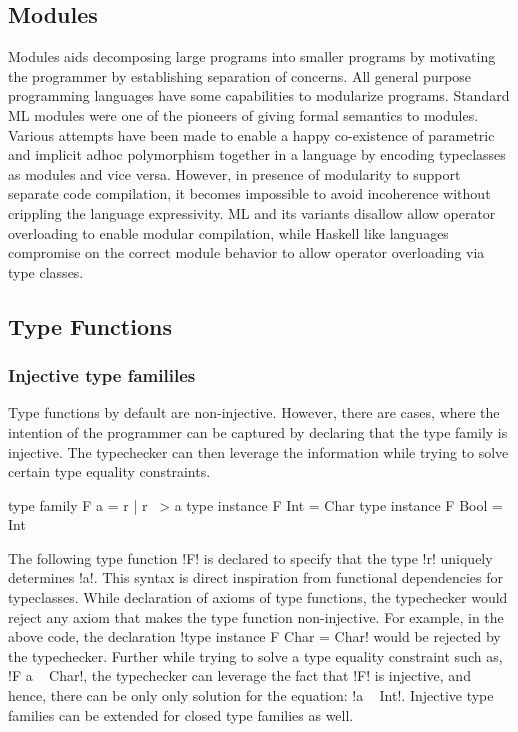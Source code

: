\documentclass[manuscript,screen,nonacm]{acmart}
\begin{document}
\subsection{Modules}
Modules aids decomposing large programs into smaller programs by motivating the programmer by establishing separation of concerns. All general purpose programming languages have some capabilities to modularize programs. Standard ML modules\cite{macqueen_modules_1984} were one of the pioneers of giving formal semantics to modules.
Various attempts\cite{dreyer_modular_2007, wehr_ml_2008, white_modular_2014} have been made to enable a happy co-existence of parametric and implicit adhoc polymorphism together in a language by encoding typeclasses as modules and vice versa. However, in presence of modularity to support separate code compilation, it becomes impossible to avoid incoherence without crippling the language expressivity. ML and its variants\cite{milner_definition_1997,leroy_ocaml_2023} disallow allow operator overloading to enable modular compilation, while Haskell like languages compromise on the correct module behavior to allow operator overloading via type classes.

\subsection{Type Functions}
\subsubsection{Injective type famililes}
Type functions by default are non-injective. However, there are cases, where the intention of the programmer can be captured by declaring that the type family is injective. The typechecker can then leverage the information while trying to solve certain type equality constraints.

\begin{CenteredBox}
\begin{code}
type family F a = r | r ~> a
type instance F Int = Char
type instance F Bool = Int
\end{code}
\end{CenteredBox}

The following type function !F! is declared to specify that the type !r! uniquely determines !a!. This syntax is direct inspiration from functional dependencies for typeclasses. While declaration of axioms of type functions, the typechecker would reject any axiom that makes the type function non-injective. For example, in the above code, the declaration !type instance F Char = Char! would be rejected by the typechecker. Further while trying to solve a type equality constraint such as, !F a ~ Char!, the typechecker can leverage the fact that !F! is injective, and hence, there can be only only solution for the equation: !a ~ Int!. Injective type families\cite{stolarek_injective_2015} can be extended for closed type families as well.
\end{document}
